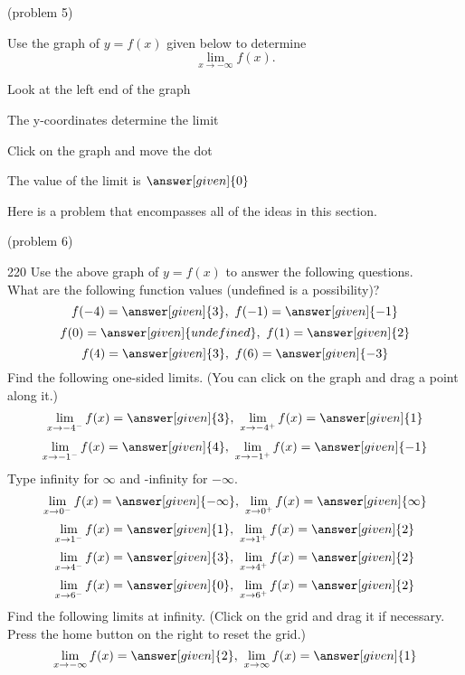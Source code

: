 \documentclass{ximera}
\begin{document}
\begin{problem}(problem 5)

  Use the graph of $y = f(x)$ given below to determine
  \[
  \lim_{x\to -\infty} f(x).
  \]
  
    \begin{hint}
      Look at the left end of the graph
    \end{hint}
    \begin{hint}
      The y-coordinates determine the limit
    \end{hint}
		\begin{hint}
		  Click on the graph and move the dot
		\end{hint}
		The value of the limit is
		 $\answer[given]{0}$

	
\end{problem}

Here is a problem that encompasses all of the ideas in this section.

\begin{problem}(problem 6)
	\begin{leash}{220}
	Use the above graph of $y = f(x)$ to answer the following questions.\\
	
  
  What are the following function values (undefined is a possibility)?  
		 \[f(-4) = \answer[given]{3}, \ f(-1) = \answer[given]{-1} \]
		 \[f(0) = \answer[given]{undefined}, \ f(1) = \answer[given]{2} \]
	   \[f(4) = \answer[given]{3}, \ f(6) = \answer[given]{-3} \]
	Find the following one-sided limits. (You can click on the graph and drag a point along it.)
	\[\lim_{x\to -4^-} f(x) = \answer[given]{3}, \ \lim_{x\to -4^+} f(x) = \answer[given]{1}\]
	\[\lim_{x\to -1^-} f(x) = \answer[given]{4}, \ \lim_{x\to -1^+} f(x) = \answer[given]{-1}\]
	Type infinity for $\infty$ and -infinity for $-\infty$.
	\[\lim_{x\to 0^-} f(x) = \answer[given]{-\infty}, \ \lim_{x\to 0^+} f(x) = \answer[given]{\infty}\]
	\[\lim_{x\to 1^-} f(x) = \answer[given]{1}, \ \lim_{x\to 1^+} f(x) = \answer[given]{2}\]
	\[\lim_{x\to 4^-} f(x) = \answer[given]{3}, \ \lim_{x\to 4^+} f(x) = \answer[given]{2}\]
	\[\lim_{x\to 6^-} f(x) = \answer[given]{0}, \ \lim_{x\to 6^+} f(x) = \answer[given]{2}\]
	Find the following limits at infinity. (Click on the grid and drag it if necessary.  
	Press the home button on the right to reset the grid.)
	\[\lim_{x\to -\infty} f(x) = \answer[given]{2}, \ \lim_{x\to \infty} f(x) = \answer[given]{1}\]
	
	\end{leash}
\end{problem}
\end{document}
